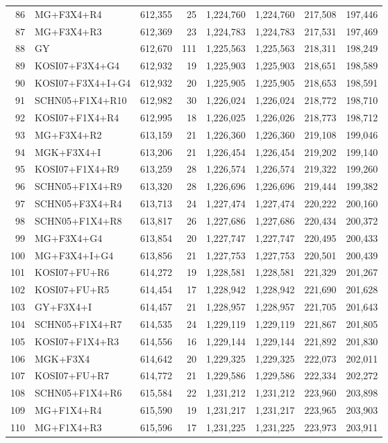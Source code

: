 \begin{longtable}{rlrrrrrr}
86&MG+F3X4+R4&612,355&25&1,224,760&1,224,760&217,508&197,446\\
87&MG+F3X4+R3&612,369&23&1,224,783&1,224,783&217,531&197,469\\
88&GY&612,670&111&1,225,563&1,225,563&218,311&198,249\\
89&KOSI07+F3X4+G4&612,932&19&1,225,903&1,225,903&218,651&198,589\\
90&KOSI07+F3X4+I+G4&612,932&20&1,225,905&1,225,905&218,653&198,591\\
91&SCHN05+F1X4+R10&612,982&30&1,226,024&1,226,024&218,772&198,710\\
92&KOSI07+F1X4+R4&612,995&18&1,226,025&1,226,026&218,773&198,712\\
93&MG+F3X4+R2&613,159&21&1,226,360&1,226,360&219,108&199,046\\
94&MGK+F3X4+I&613,206&21&1,226,454&1,226,454&219,202&199,140\\
95&KOSI07+F1X4+R9&613,259&28&1,226,574&1,226,574&219,322&199,260\\
96&SCHN05+F1X4+R9&613,320&28&1,226,696&1,226,696&219,444&199,382\\
97&SCHN05+F3X4+R4&613,713&24&1,227,474&1,227,474&220,222&200,160\\
98&SCHN05+F1X4+R8&613,817&26&1,227,686&1,227,686&220,434&200,372\\
99&MG+F3X4+G4&613,854&20&1,227,747&1,227,747&220,495&200,433\\
100&MG+F3X4+I+G4&613,856&21&1,227,753&1,227,753&220,501&200,439\\
101&KOSI07+FU+R6&614,272&19&1,228,581&1,228,581&221,329&201,267\\
102&KOSI07+FU+R5&614,454&17&1,228,942&1,228,942&221,690&201,628\\
103&GY+F3X4+I&614,457&21&1,228,957&1,228,957&221,705&201,643\\
104&SCHN05+F1X4+R7&614,535&24&1,229,119&1,229,119&221,867&201,805\\
105&KOSI07+F1X4+R3&614,556&16&1,229,144&1,229,144&221,892&201,830\\
106&MGK+F3X4&614,642&20&1,229,325&1,229,325&222,073&202,011\\
107&KOSI07+FU+R7&614,772&21&1,229,586&1,229,586&222,334&202,272\\
108&SCHN05+F1X4+R6&615,584&22&1,231,212&1,231,212&223,960&203,898\\
109&MG+F1X4+R4&615,590&19&1,231,217&1,231,217&223,965&203,903\\
110&MG+F1X4+R3&615,596&17&1,231,225&1,231,225&223,973&203,911\\

\end{longtable}
